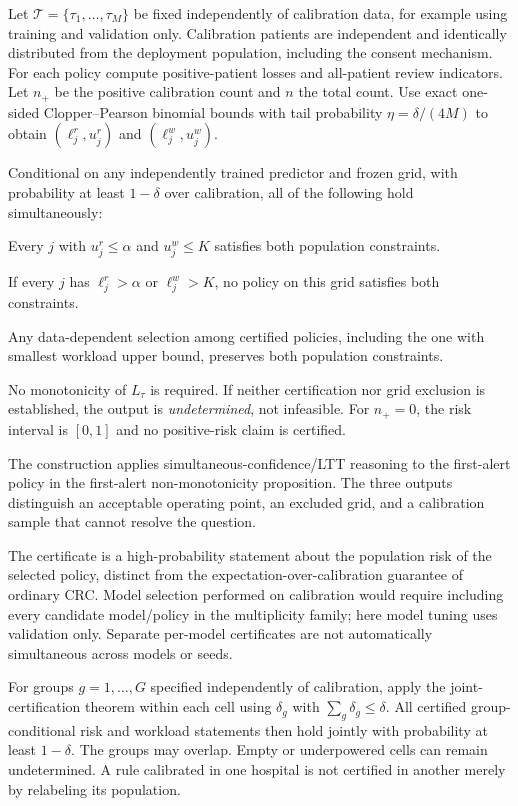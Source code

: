 Let $\mathcal T=\{\tau_1,\ldots,\tau_M\}$ be fixed independently of calibration data, for example using training and validation only. Calibration patients are independent and identically distributed from the deployment population, including the consent mechanism. For each policy compute positive-patient losses and all-patient review indicators. Let $n_+$ be the positive calibration count and $n$ the total count. Use exact one-sided Clopper--Pearson binomial bounds \citep{clopper} with tail probability $\eta=\delta/(4M)$ to obtain $(\ell^r_j,u^r_j)$ and $(\ell^w_j,u^w_j)$.

\begin{theorem}
Conditional on any independently trained predictor and frozen grid, with probability at least $1-\delta$ over calibration, all of the following hold simultaneously:


Every $j$ with $u^r_j\le\alpha$ and $u^w_j\le K$ satisfies both population constraints.

If every $j$ has $\ell^r_j>\alpha$ or $\ell^w_j>K$, no policy on this grid satisfies both constraints.

Any data-dependent selection among certified policies, including the one with smallest workload upper bound, preserves both population constraints.

No monotonicity of $L_\tau$ is required. If neither certification nor grid exclusion is established, the output is \emph{undetermined}, not infeasible. For $n_+=0$, the risk interval is $[0,1]$ and no positive-risk claim is certified.
\end{theorem}
The construction applies simultaneous-confidence/LTT reasoning to the first-alert policy in the first-alert non-monotonicity proposition. The three outputs distinguish an acceptable operating point, an excluded grid, and a calibration sample that cannot resolve the question.

The certificate is a high-probability statement about the population risk of the selected policy, distinct from the expectation-over-calibration guarantee of ordinary CRC. Model selection performed on calibration would require including every candidate model/policy in the multiplicity family; here model tuning uses validation only. Separate per-model certificates are not automatically simultaneous across models or seeds.

\begin{corollary}
For groups $g=1,\ldots,G$ specified independently of calibration, apply the joint-certification theorem within each cell using $\delta_g$ with $\sum_g\delta_g\le\delta$. All certified group-conditional risk and workload statements then hold jointly with probability at least $1-\delta$. The groups may overlap. Empty or underpowered cells can remain undetermined. A rule calibrated in one hospital is not certified in another merely by relabeling its population.
\end{corollary}

